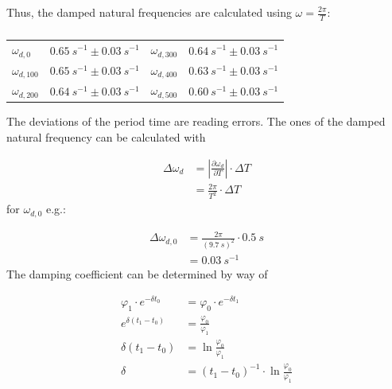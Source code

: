             Thus, the damped natural frequencies are calculated using \(\omega=\frac{2\pi}{T}\):\par
            \begin{table}[h]
                \centering
                \caption[Damped natural frequencies]{}
                \begin{tabular}{@{}llll@{}}
                    \toprule
                    $\omega_{d,0}$      &$\SI{0.65}{s^{-1}} \pm \SI{0.03}{s^{-1}}$  &\hspace{10mm}$\omega_{d,300}$  &$\SI{0.64}{s^{-1}} \pm \SI{0.03}{s^{-1}}$\\
                    $\omega_{d,100}$    &$\SI{0.65}{s^{-1}} \pm \SI{0.03}{s^{-1}}$  &\hspace{10mm}$\omega_{d,400}$  &$\SI{0.63}{s^{-1}} \pm \SI{0.03}{s^{-1}}$\\
                    $\omega_{d,200}$    &$\SI{0.64}{s^{-1}} \pm \SI{0.03}{s^{-1}}$  &\hspace{10mm}$\omega_{d,500}$  &$\SI{0.60}{s^{-1}} \pm \SI{0.03}{s^{-1}}$\\
                    \bottomrule
                \end{tabular}
                \label{tab:damped_natural_frequencies}
            \end{table}
            The deviations of the period time are reading errors. The ones of the damped natural frequency can be calculated with\par
            \begin{align}
                \Delta \omega_d &=\left|\frac{\partial \omega_d}{\partial T}\right| \cdot \Delta T \nonumber \\
                                &=\frac{2\pi}{T^2}\cdot \Delta T
            \end{align}
            for \(\omega_{d,0}\) e.g.:\par
            \begin{align}
                \Delta\omega_{d,0}  &=\frac{2\pi}{(\SI{9.7}{s})^2}\cdot \SI{0.5}{s} \nonumber \\
                                    &=\SI{0.03}{s^{-1}}
            \end{align}
            The damping coefficient can be determined by way of\par
            \begin{align}
                \varphi_1 \cdot e^{-\delta t_0} &=\varphi_0 \cdot e^{-\delta t_1} \nonumber \\%
                e^{\delta(t_1-t_0)}             &=\frac{\varphi_0}{\varphi_1} \nonumber \\%
                \delta(t_1-t_0)                 &=\ln{\frac{\varphi_0}{\varphi_1}} \nonumber \\%
                \delta                          &=(t_1-t_0)^{-1}\cdot\ln{\frac{\varphi_0}{\varphi_1}}
            \end{align}
